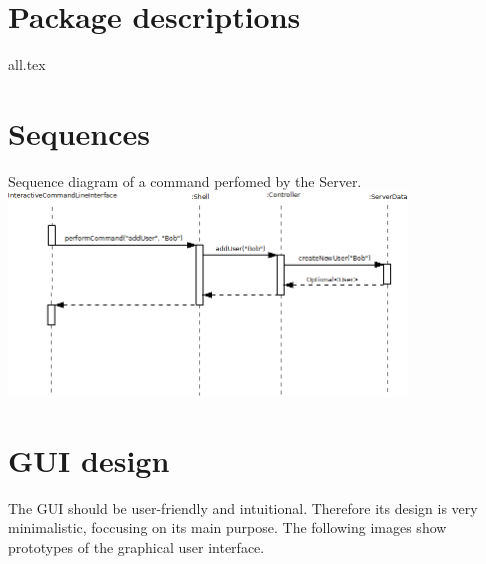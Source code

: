 \documentclass[a4paper,10pt]{scrartcl}
\begin{document}
\section{Package descriptions}
{all.tex}

\section{Sequences}
\begin{illustration}{Sequence diagram of a command perfomed by the Server.}
\includegraphics [width=400px] {figures/sequence_diagramm_server/Server1.png}
\end{illustration}

%

\section{GUI design}
The GUI should be user-friendly and intuitional. Therefore its design is very minimalistic, foccusing on its main purpose. 
The following images show prototypes of the graphical user interface.
\end{document}
